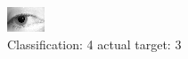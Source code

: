 \begin{figure}[h!]
\begin{center}
\includegraphics[width=0.60\columnwidth]{figures/ID1309_class_4_target_3.png}
\end{center}
\caption{ Classification: 4 actual target: 3}
\label{fig:ID1309_class_4_target_3}
\end{figure}
